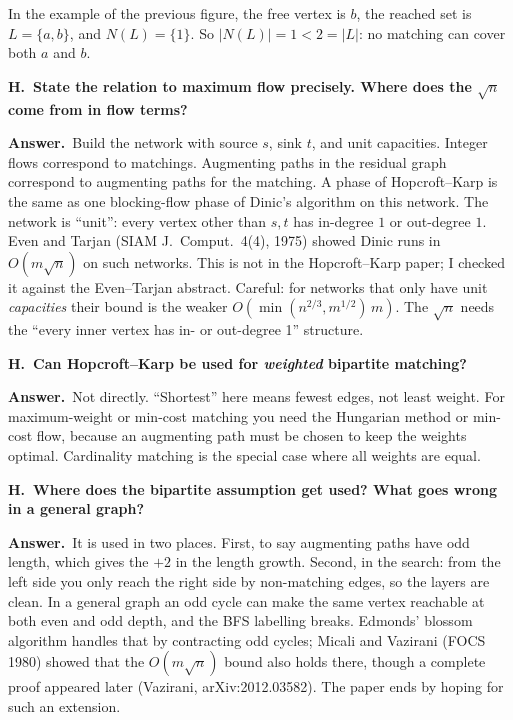 \documentclass[11pt]{article}
\newcommand{\Qhead}[2]{%
  \vspace{0.9em}\par\noindent
  {\large\bfseries #1\ #2}\par\nopagebreak\vspace{-0.2em}}
\newcommand{\HQ}[1]{\refstepcounter{qh}\Qhead{H\theqh.}{#1}}
\newcommand{\A}{\par\noindent\textbf{Answer.}\ }
\begin{document}
In the example of the previous figure, the free vertex is $b$, the reached set is
$L=\{a,b\}$, and $N(L)=\{1\}$. So $|N(L)|=1<2=|L|$: no matching can cover both $a$ and $b$.
\HQ{State the relation to maximum flow precisely. Where does the $\sqrt{n}$ come from in flow terms?}
\A Build the network with source $s$, sink $t$, and unit capacities. Integer flows
correspond to matchings. Augmenting paths in the residual graph correspond to
augmenting paths for the matching. A phase of Hopcroft--Karp is the same as one
blocking-flow phase of Dinic's algorithm on this network. The network is
``unit'': every vertex other than $s,t$ has in-degree $1$ or out-degree $1$.
Even and Tarjan (SIAM J.\ Comput.\ 4(4), 1975) showed Dinic runs in $O(m\sqrt{n})$
on such networks. This is not in the Hopcroft--Karp paper; I checked it against
the Even--Tarjan abstract. Careful: for networks that only have unit \emph{capacities}
their bound is the weaker $O(\min(n^{2/3},m^{1/2})\,m)$. The $\sqrt{n}$ needs the
``every inner vertex has in- or out-degree 1'' structure.

\HQ{Can Hopcroft--Karp be used for \emph{weighted} bipartite matching?}
\A Not directly. ``Shortest'' here means fewest edges, not least weight. For
maximum-weight or min-cost matching you need the Hungarian method or min-cost
flow, because an augmenting path must be chosen to keep the weights optimal.
Cardinality matching is the special case where all weights are equal.

\HQ{Where does the bipartite assumption get used? What goes wrong in a general graph?}
\A It is used in two places. First, to say augmenting paths have odd length, which
gives the $+2$ in the length growth. Second, in the search: from the left side you
only reach the right side by non-matching edges, so the layers are clean. In a
general graph an odd cycle can make the same vertex reachable at both even and odd
depth, and the BFS labelling breaks. Edmonds' blossom algorithm handles that by
contracting odd cycles; Micali and Vazirani (FOCS 1980) showed that the $O(m\sqrt{n})$ bound
also holds there, though a complete proof appeared later (Vazirani, arXiv:2012.03582).
The paper ends by hoping for such an extension.
\end{document}
